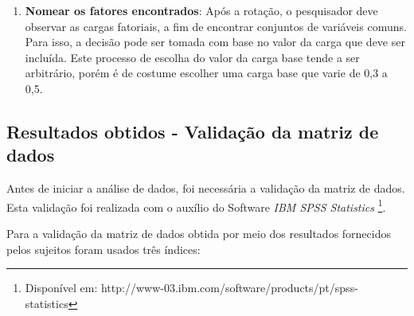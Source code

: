 \begin{enumerate}
As rotações ortogonais são mais fáceis de reportar e de interpretar . Porém, o pesquisador deve assumir que os construtos\footnote{Instrumentos de Coleta} são independentes (na prática essa restrição é mais difícil de ser respeitada). Por sua vez, as rotações oblíquas permitem que os fatores sejam correlacionados. Entretanto, são mais difíceis de descrever e interpretar \cite{maroco2013}. 

\item \textbf{Nomear os fatores encontrados}: Após a rotação, o pesquisador deve observar as cargas fatoriais, a fim de encontrar conjuntos de variáveis comuns. Para isso, a decisão  pode ser tomada com base no valor da carga que deve ser incluída. Este processo de escolha do valor da carga base tende a ser arbitrário, porém é de costume escolher uma carga base que varie de 0,3 a 0,5.

\end{enumerate}

\subsection{Resultados obtidos - Validação da matriz de dados}

Antes de iniciar a análise de dados, foi necessária a validação da matriz de dados. Esta validação foi realizada com o auxílio do Software \textit{IBM SPSS Statistics }\circledR \footnote{Disponível em: http://www-03.ibm.com/software/products/pt/spss-statistics}. 

Para a validação da matriz de dados obtida por meio dos resultados fornecidos pelos sujeitos foram usados três índices:


